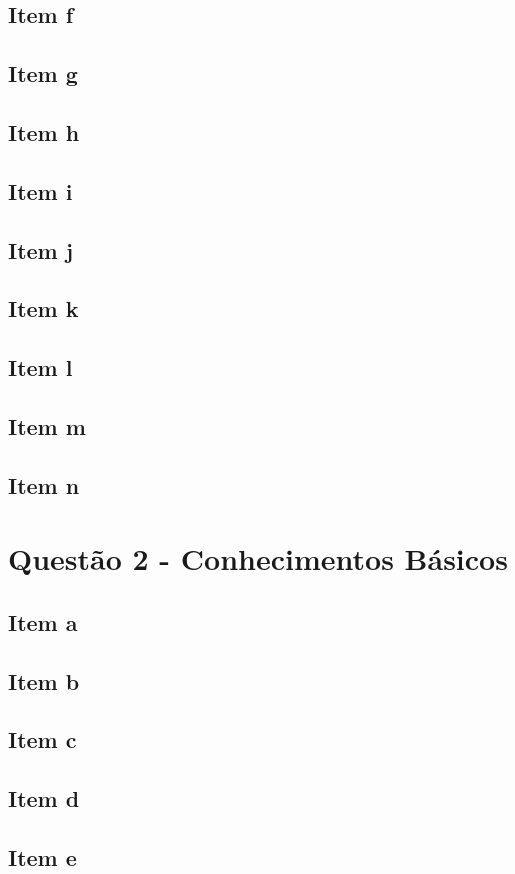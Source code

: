 \documentclass[a4paper, 12pt]{article}
\begin{document}
		\subsection{Item f}	
		\subsection{Item g}	
		\subsection{Item h}	
		\subsection{Item i}	
		\subsection{Item j}	
		\subsection{Item k}	
		\subsection{Item l}	
		\subsection{Item m}	
		\subsection{Item n}		
	\section{Quest\~{a}o 2 - Conhecimentos Básicos}
		\subsection{Item a}	
		\subsection{Item b}	
		\subsection{Item c}	
		\subsection{Item d}	
		\subsection{Item e}	
\end{document}
